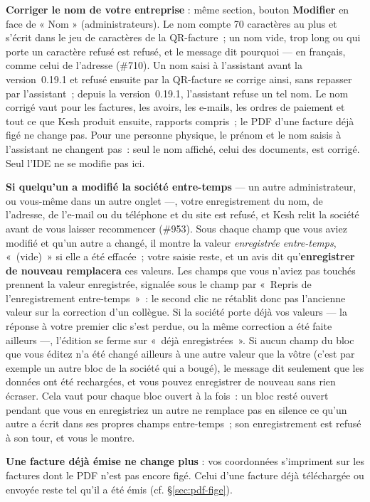 \documentclass[a4paper,11pt,oneside]{article}
\begin{document}
\textbf{Corriger le nom de votre entreprise} : même section, bouton \textbf{Modifier} en face de « Nom » (administrateurs). Le nom compte 70 caractères au plus et s'écrit dans le jeu de caractères de la QR-facture~; un nom vide, trop long ou qui porte un caractère refusé est refusé, et le message dit pourquoi --- en français, comme celui de l'adresse (\#710). Un nom saisi à l'assistant avant la version~0.19.1 et refusé ensuite par la QR-facture se corrige ainsi, sans repasser par l'assistant~; depuis la version~0.19.1, l'assistant refuse un tel nom. Le nom corrigé vaut pour les factures, les avoirs, les e-mails, les ordres de paiement et tout ce que Kesh produit ensuite, rapports compris~; le PDF d'une facture déjà figé ne change pas. Pour une personne physique, le prénom et le nom saisis à l'assistant ne changent pas~: seul le nom affiché, celui des documents, est corrigé. Seul l'IDE ne se modifie pas ici.

\textbf{Si quelqu'un a modifié la société entre-temps} --- un autre administrateur, ou vous-même dans un autre onglet ---, votre enregistrement du nom, de l'adresse, de l'e-mail ou du téléphone et du site est refusé, et Kesh relit la société avant de vous laisser recommencer (\#953). Sous chaque champ que vous aviez modifié et qu'un autre a changé, il montre la valeur \emph{enregistrée entre-temps}, «~(vide)~» si elle a été effacée~; votre saisie reste, et un avis dit qu'\textbf{enregistrer de nouveau remplacera} ces valeurs. Les champs que vous n'aviez pas touchés prennent la valeur enregistrée, signalée sous le champ par «~Repris de l'enregistrement entre-temps~»~: le second clic ne rétablit donc pas l'ancienne valeur sur la correction d'un collègue. Si la société porte déjà vos valeurs --- la réponse à votre premier clic s'est perdue, ou la même correction a été faite ailleurs ---, l'édition se ferme sur «~déjà enregistrées~». Si aucun champ du bloc que vous éditez n'a été changé ailleurs à une autre valeur que la vôtre (c'est par exemple un autre bloc de la société qui a bougé), le message dit seulement que les données ont été rechargées, et vous pouvez enregistrer de nouveau sans rien écraser. Cela vaut pour chaque bloc ouvert à la fois~: un bloc resté ouvert pendant que vous en enregistriez un autre ne remplace pas en silence ce qu'un autre a écrit dans ses propres champs entre-temps~; son enregistrement est refusé à son tour, et vous le montre.

\textbf{Une facture déjà émise ne change plus} : vos coordonnées s'impriment sur les factures dont le PDF n'est pas encore figé. Celui d'une facture déjà téléchargée ou envoyée reste tel qu'il a été émis (cf. \S\ref{sec:pdf-fige}).
\end{document}
